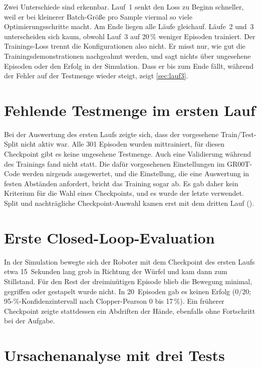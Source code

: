 Zwei Unterschiede sind erkennbar. Lauf~1 senkt den Loss zu Beginn schneller,
weil er bei kleinerer Batch-Größe pro Sample viermal so viele
Optimierungsschritte macht. Am Ende liegen alle Läufe gleichauf. Läufe~2 und~3
unterscheiden sich kaum, obwohl Lauf~3 auf 20\,\% weniger Episoden trainiert. Der Trainings-Loss trennt die Konfigurationen also nicht.
Er misst nur, wie gut die Trainingsdemonstrationen nachgeahmt werden, und
sagt nichts über ungesehene Episoden oder den Erfolg in der Simulation. Dass er
bis zum Ende fällt, während der Fehler auf der Testmenge wieder steigt, zeigt
\cref{sec:lauf3}.

\section{Fehlende Testmenge im ersten Lauf}
\label{sec:split-befund}

Bei der Auswertung des ersten Laufs zeigte sich, dass der vorgesehene
Train/Test-Split nicht aktiv war. Alle 301 Episoden wurden mittrainiert, für
diesen Checkpoint gibt es keine ungesehene Testmenge. Auch eine Validierung
während des Trainings fand nicht statt. Die dafür vorgesehenen Einstellungen
im GR00T-Code werden nirgends ausgewertet, und die Einstellung, die eine
Auswertung in festen Abständen anfordert, bricht das Training sogar ab. Es
gab daher kein Kriterium für die Wahl eines Checkpoints, und es wurde der
letzte verwendet. Split und nachträgliche Checkpoint-Auswahl kamen erst mit
dem dritten Lauf ().

\section{Erste Closed-Loop-Evaluation}
\label{sec:closed-loop-ergebnis}

In der Simulation bewegte sich der Roboter mit dem Checkpoint des ersten Laufs
etwa 15~Sekunden lang grob in Richtung der Würfel und kam dann zum
Stillstand. Für den Rest der dreiminütigen Episode blieb die Bewegung minimal,
gegriffen oder gestapelt wurde nicht. In 20~Episoden gab es keinen Erfolg
($0/20$; 95-\%-Konfidenzintervall nach Clopper-Pearson 0 bis 17\,\%). Ein
früherer Checkpoint zeigte stattdessen ein Abdriften der Hände, ebenfalls ohne
Fortschritt bei der Aufgabe.

\section{Ursachenanalyse mit drei Tests}
\label{sec:diagnose}

